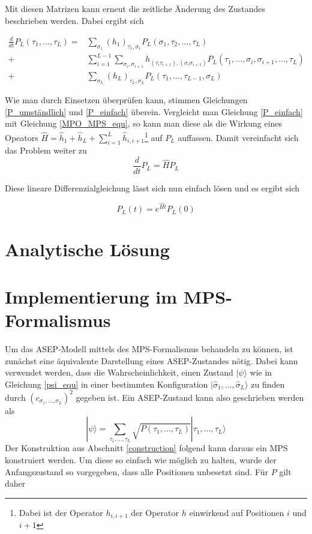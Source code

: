 \documentclass[10pt,a4paper]{report}
\newcommand{\SumIndex}{\sigma_1,\ldots,\sigma_L}
\newcommand{\SumIndexTau}{\tau_1,\ldots,\tau_L}
\begin{document}
Mit diesen Matrizen kann erneut die zeitliche Änderung des Zustandes beschrieben werden. Dabei ergibt sich

\begin{equation}\label{P_einfach}
\begin{split}
\frac{d}{dt}P_L(\tau_1,\ldots,\tau_L) =& \sum_{\sigma_1}(h_1)_{\tau_1,\sigma_1}P_L(\sigma_1,\tau_2,\ldots,\tau_L)\\
+&\sum_{i=1}^{L-1}\sum_{\sigma_i,\sigma_{i+1}}h_{(\tau_i\tau_{i+1}),(\sigma_i\sigma_{i+1})}P_L(\tau_1,\ldots,\sigma_i,\sigma_{i+1},\ldots,\tau_L)\\
+&\sum_{\sigma_L}(h_L)_{\tau_L,\sigma_L}P_L(\tau_1,\ldots,\tau_{L-1},\sigma_L)
\end{split}
\end{equation}

Wie man durch Einsetzen überprüfen kann, stimmen Gleichungen \ref{P_umständlich} und \ref{P_einfach} überein. Vergleicht man Gleichung \ref{P_einfach} mit Gleichung \ref{MPO_MPS_equ}, so kann man diese als die Wirkung eines Opeators $\hat{H}=\hat{h}_1+\hat{h}_L+\sum_{i=1}^L\hat{h}_{i,i+1}$\footnote{Dabei ist der Operator $h_{i,i+1}$ der Operator $h$ einwirkend auf Positionen $i$ und $i+1$} auf $P_L$ auffassen.  Damit vereinfacht sich das Problem weiter zu
\begin{equation}
\frac{d}{dt}P_L=\hat{H}P_L
\end{equation}

Diese lineare Differenzialgleichung lässt sich nun einfach lösen und es ergibt sich

\begin{equation}\label{ASEP_solution_equ}
P_L(t)=e^{\hat{H}t}P_L(0)
\end{equation}

\section{Analytische Lösung}



\section{Implementierung im MPS-Formalismus}

Um das ASEP-Modell mittels des MPS-Formalismus behandeln zu können, ist zunächst eine äquivalente Darstellung eines ASEP-Zustandes nötig. Dabei kann verwendet werden, dass die Wahrscheinlichkeit, einen Zustand $|\psi\rangle$ wie in Gleichung \ref{psi_equ} in einer bestimmten Konfiguration $|\hat{\sigma}_1,\ldots,\hat{\sigma}_L\rangle$ zu finden durch $(c_{\SumIndex})^2$ gegeben ist. Ein ASEP-Zustand kann also geschrieben werden als
\begin{equation}
|\psi\rangle=\sum_{\SumIndexTau} \sqrt{P(\SumIndexTau)}|\SumIndexTau\rangle
\end{equation}
Der Konstruktion aus Abschnitt \ref{construction} folgend kann daraus ein MPS konstruiert werden. Um diese so einfach wie möglich zu halten, wurde der Anfangszustand so vorgegeben, dass alle Positionen unbesetzt sind. Für $P$ gilt daher
\end{document}
